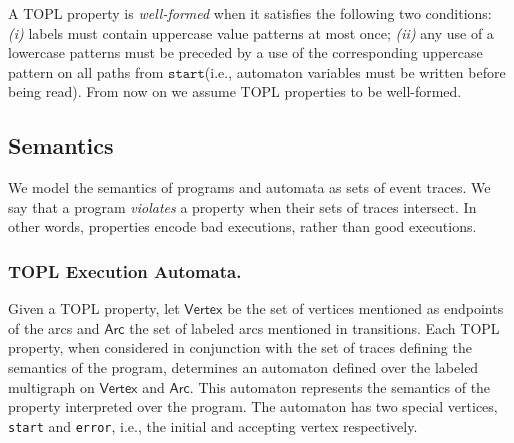 \documentclass[10pt, preprint]{sigplanconf} %
\newcommand{\set}[1]{\ensuremath{\mathsf{#1}}}
\newcommand{\start}{\ensuremath{\mathtt{start}}\xspace}
\begin{document}
\smallskip
A TOPL property is \emph{well-formed} when it satisfies the following two conditions:
{\em (i)} labels must contain uppercase value patterns at most once; {\em (ii)}
any use of a lowercase patterns must be preceded by a use of the corresponding uppercase pattern on all paths from \start  (i.e., automaton variables must be written before being read).
From now on we assume TOPL properties to be well-formed.

\subsection{Semantics}\label{sec:semantics} %
We model the semantics of programs and automata as sets of event traces.
We say that a program \emph{violates} a property when their sets of traces intersect.
In other words, properties encode bad executions, rather than good executions.

\subsubsection{TOPL Execution Automata.}
\newcommand{\World}{ExecState}

Given a TOPL property,  
let $\set{Vertex}$ be the set of vertices mentioned as endpoints of the arcs and $\set{Arc}$ the set of labeled arcs mentioned in transitions.
Each TOPL property, when considered in conjunction with the set of traces defining the semantics of the program, determines  an automaton defined over the labeled multigraph  on $\set{Vertex}$ and $\set{Arc}$.
This automaton represents the semantics of the property interpreted over the program.
The automaton has two special vertices, {\tt start} and {\tt error},  i.e., the initial and accepting vertex respectively.
\end{document}
